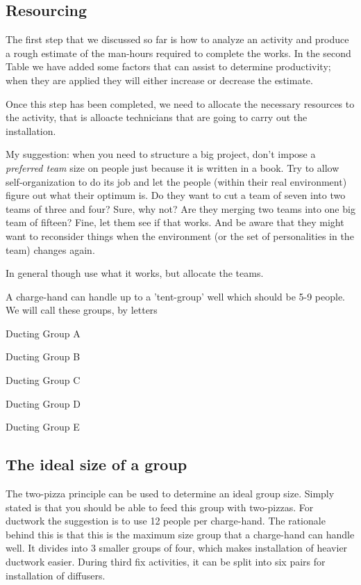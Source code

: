 \subsection{Resourcing}

The first step that we discussed so far is how to analyze an activity and
produce a rough estimate of the man-hours required to complete the works.
In the second Table we have added some factors that can assist to determine
productivity; when they are applied they will either increase or decrease
the estimate. 

Once this step has been completed, we need to allocate the necessary resources
to the activity, that is alloacte technicians that are going to carry out the
installation.

My suggestion: when you need to structure a big project, don’t impose a \textit{preferred team} size on people just because it is written in a book. Try to allow self-organization to do its job and let the people (within their real environment) figure out what their optimum is. Do they want to cut a team of seven into two teams of three and four? Sure, why not? Are they merging two teams into one big team of fifteen? Fine, let them see if that works. And be aware that they might want to reconsider things when the environment (or the set of personalities in the team) changes again.

In general though use what it works, but allocate the teams.

A charge-hand can handle up to a 'tent-group' well which should be 5-9 people. We will call these groups, by letters

Ducting Group A

Ducting Group B

Ducting Group C

Ducting Group D

Ducting Group E


\subsection*{The ideal size of a group}

The two-pizza principle can be used to determine an ideal group size. Simply
stated is that you should be able to feed this group with two-pizzas.  For ductwork
the suggestion is to use 12 people per charge-hand. The rationale behind this
is that this is the maximum size group that a charge-hand can handle well. It
divides into 3 smaller groups of four, which makes installation of heavier
ductwork easier. During third fix activities, it can be split into six pairs
for installation of diffusers.

